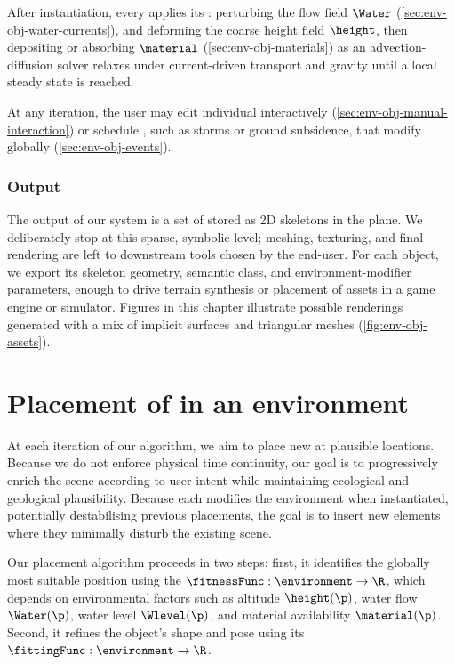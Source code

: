 After instantiation, every  applies its : perturbing the flow field $\Water$ (\cref{sec:env-obj-water-currents}), and deforming the coarse height field $\height$, then depositing or absorbing  $\material$ (\cref{sec:env-obj-materials}) as an advection-diffusion solver relaxes  under current-driven transport and gravity until a local steady state is reached.

At any iteration, the user may edit individual  interactively (\cref{sec:env-obj-manual-interaction}) or schedule , such as storms or ground subsidence, that modify  globally (\cref{sec:env-obj-events}).

\subsubsection{Output}

The output of our system is a set of  stored as 2D skeletons in the plane. We deliberately stop at this sparse, symbolic level; meshing, texturing, and final rendering are left to downstream tools chosen by the end-user. For each object, we export its skeleton geometry, semantic class, and environment-modifier parameters, enough to drive terrain synthesis or placement of assets in a game engine or simulator. Figures in this chapter illustrate possible renderings generated with a mix of implicit surfaces and triangular meshes (\cref{fig:env-obj-assets}).

\section{Placement of  in an environment}
\label{sec:env-obj-generation-rules}

At each iteration of our algorithm, we aim to place new  at plausible locations. Because we do not enforce physical time continuity, our goal is to progressively enrich the scene according to user intent while maintaining ecological and geological plausibility.
Because each  modifies the environment when instantiated, potentially destabilising previous placements, the goal is to insert new elements where they minimally disturb the existing scene.

Our placement algorithm proceeds in two steps: first, it identifies the globally most suitable position using the  $\fitnessFunc: \environment \to \R$, which depends on environmental factors such as altitude $\height(\p)$, water flow $\Water(\p)$, water level $\Wlevel(\p)$, and material availability $\material(\p)$. Second, it refines the object's shape and pose using its  $\fittingFunc: \environment \to \R$.

